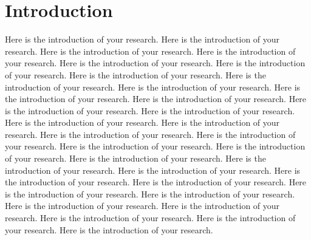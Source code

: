 \section{Introduction}
Here is the introduction of your research.
Here is the introduction of your research.
Here is the introduction of your research.
Here is the introduction of your research.
Here is the introduction of your research.
Here is the introduction of your research.
Here is the introduction of your research.
Here is the introduction of your research.
Here is the introduction of your research.
Here is the introduction of your research.
Here is the introduction of your research.
Here is the introduction of your research.
Here is the introduction of your research.
Here is the introduction of your research.
Here is the introduction of your research.
Here is the introduction of your research.
Here is the introduction of your research.
Here is the introduction of your research.
Here is the introduction of your research.
Here is the introduction of your research.
Here is the introduction of your research.
Here is the introduction of your research.
Here is the introduction of your research.
Here is the introduction of your research.
Here is the introduction of your research.
Here is the introduction of your research.
Here is the introduction of your research.
Here is the introduction of your research.
Here is the introduction of your research.
Here is the introduction of your research.
Here is the introduction of your research.